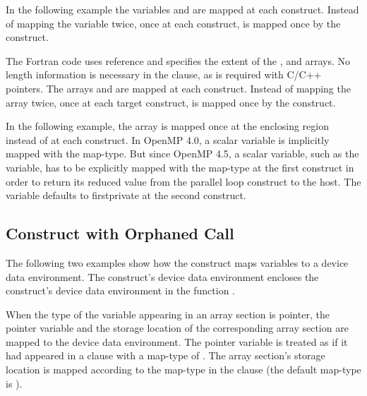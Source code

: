In the following example the variables  and  are mapped at each  
construct. Instead of mapping the variable  twice, once at each  
construct,  is mapped once by the  construct.



The Fortran code uses reference and specifies the extent of the ,  and  arrays. 
No length information is necessary in the  clause, as is required with 
C/C++ pointers. The arrays  and  are mapped at each  construct. 
Instead of mapping the array  twice, once at each target construct,  is mapped 
once by the  construct.


In the following example, the array  is mapped once at the enclosing 
 region instead of at each  construct. 
In OpenMP 4.0, a scalar variable is implicitly mapped with the  map-type.
But since OpenMP 4.5, a scalar variable, such as the  variable, has to be explicitly mapped with 
the  map-type at the first  construct in order to return 
its reduced value from the parallel loop construct to the host.
The variable defaults to firstprivate at the second  construct.



\subsection{ Construct with Orphaned Call}

The following two examples show how the  construct 
maps variables to a device data environment. The  
construct's device data environment encloses the  construct's device 
data environment in the function .

When the type of the variable appearing in an array section is pointer, the pointer 
variable and the storage location of the corresponding array section are mapped 
to the device data environment. The pointer variable is treated as if it had appeared 
in a  clause with a map-type of . The array section's 
storage location is mapped according to the map-type in the  clause 
(the default map-type is ).

